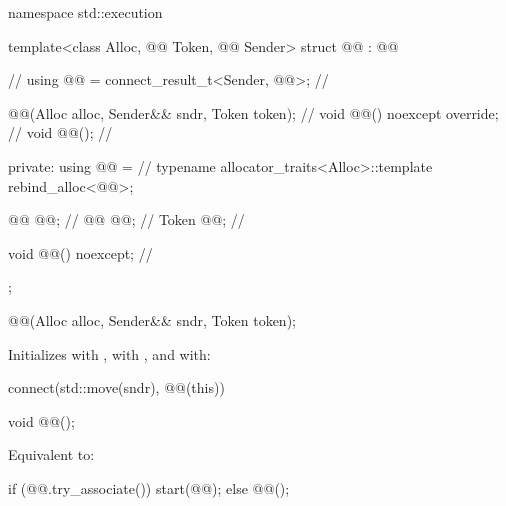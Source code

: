 %
\begin{codeblock}
namespace std::execution {
  template<class Alloc, @@ Token, @@ Sender>
  struct @@ : @@ {                   // \expos
    using @@ = connect_result_t<Sender, @@>;  // \expos

    @@(Alloc alloc, Sender&& sndr, Token token);   // \expos
    void @@() noexcept override;                      // \expos
    void @@();                                             // \expos

  private:
    using @@ =                                         // \expos
      typename allocator_traits<Alloc>::template rebind_alloc<@@>;

    @@ @@;                                          // \expos
    @@ @@;                                                // \expos
    Token @@;                                            // \expos

    void @@() noexcept;                                // \expos
  };
}
\end{codeblock}

%
\begin{itemdecl}
@@(Alloc alloc, Sender&& sndr, Token token);
\end{itemdecl}

\begin{itemdescr}
\pnum
\effects
Initializes
 with ,
 with , and
 with:
\begin{codeblock}
connect(std::move(sndr), @@(this))
\end{codeblock}
\end{itemdescr}

%
\begin{itemdecl}
void @@();
\end{itemdecl}

\begin{itemdescr}
\pnum
\effects
Equivalent to:
\begin{codeblock}
if (@@.try_associate())
  start(@@);
else
  @@();
\end{codeblock}
\end{itemdescr}

